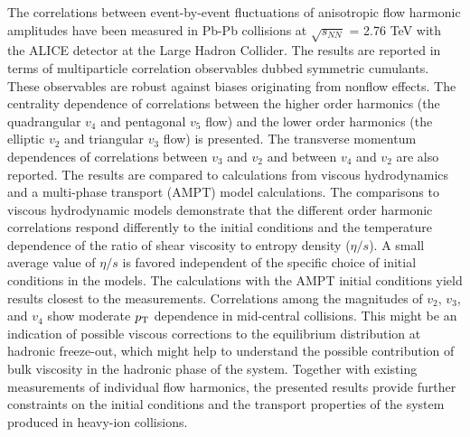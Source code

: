The correlations between event-by-event fluctuations of anisotropic flow harmonic amplitudes
have been measured in Pb-Pb collisions at $\sqrt{s_{NN}}$ = 2.76 TeV with the ALICE detector at the Large Hadron Collider. 
The results are reported in terms of multiparticle correlation observables dubbed symmetric cumulants.
These observables are robust against biases originating from nonflow effects. 
The centrality dependence of correlations between the higher order harmonics (the quadrangular $v_4$ and pentagonal $v_5$ flow) and the lower order harmonics (the elliptic $v_2$ and triangular $v_3$ flow)
is presented. The transverse momentum dependences of correlations between $v_3$ and $v_2$ and between $v_4$ and $v_2$ are also reported. 
The results are compared to calculations from viscous hydrodynamics and  a multi-phase transport ({AMPT}) model calculations.
The comparisons to viscous hydrodynamic models demonstrate that
the different order harmonic correlations respond differently to the initial conditions and the temperature dependence of the ratio of shear viscosity to entropy density ($\eta/s$). 
A small average value of $\eta/s$ is favored independent of the specific choice of initial conditions in the models. The calculations with the AMPT initial conditions yield results closest to the measurements. 
Correlations among the magnitudes of $v_2$, $v_3$, and $v_4$ show moderate $p_{\rm T}$ dependence in mid-central collisions. This might be an indication of possible viscous corrections to the equilibrium distribution at hadronic freeze-out, which might help to understand the possible contribution of bulk viscosity in the hadronic phase of the system.
Together with existing measurements of individual flow harmonics, the presented results provide further constraints 
on the initial conditions and the transport properties of the system produced in heavy-ion collisions.
